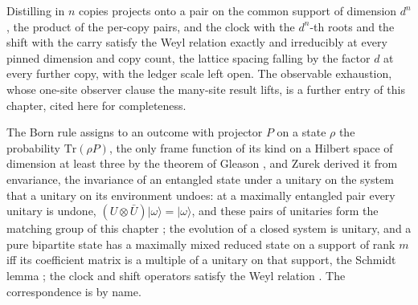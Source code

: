 Distilling in $n$ copies projects onto a pair on the common support of dimension $d^n$, the product of the per-copy pairs, and the clock with the $d^n$-th roots and the shift with the carry satisfy the Weyl relation exactly and irreducibly at every pinned dimension and copy count, the lattice spacing falling by the factor $d$ at every further copy, with the ledger scale left open.
The observable exhaustion, whose one-site observer clause the many-site result lifts, is a further entry of this chapter, cited here for completeness.
\begin{chbridge}
The Born rule assigns to an outcome with projector $P$ on a state $\rho$ the probability $\mathrm{Tr}(\rho P)$, the only frame function of its kind on a Hilbert space of dimension at least three by the theorem of Gleason \cite{Gleason1957}, and Zurek derived it from envariance, the invariance of an entangled state under a unitary on the system that a unitary on its environment undoes: at a maximally entangled pair every unitary is undone, $(U\otimes\bar{U})\lvert\omega\rangle=\lvert\omega\rangle$, and these pairs of unitaries form the matching group of this chapter \cite{Zurek2003envariance,Zurek2005}; the evolution of a closed system is unitary, and a pure bipartite state has a maximally mixed reduced state on a support of rank $m$ iff its coefficient matrix is a multiple of a unitary on that support, the Schmidt lemma \cite{Nielsen2000}; the clock and shift operators satisfy the Weyl relation \cite{Weyl1927}. The correspondence is by name.
\end{chbridge}
